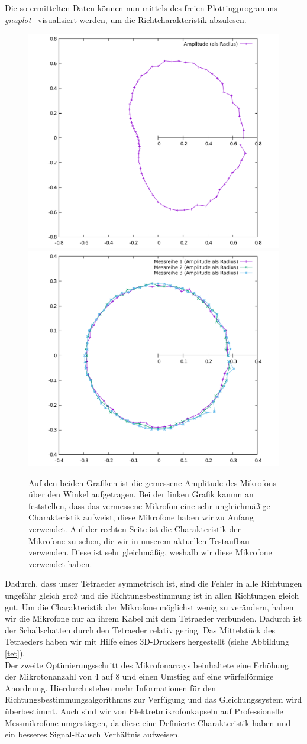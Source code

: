 Die so ermittelten Daten können nun mittels des freien Plottingprogramms \textit{gnuplot}~\cite{Gnuplot} visualisiert werden, um die Richtcharakteristik abzulesen.
\begin{figure}[H]
  \centering
  \includegraphics[width=0.45\linewidth]{img/badMic}
  \includegraphics[width=0.45\linewidth]{img/goodMic}
  \caption{Auf den beiden Grafiken ist die gemessene Amplitude des Mikrofons über den Winkel aufgetragen. Bei der linken Grafik kanmn an feststellen, dass das vermessene Mikrofon eine sehr ungleichmäßige Charakteristik aufweist, diese Mikrofone haben wir zu Anfang verwendet. Auf der rechten Seite ist die Charakteristik der Mikrofone zu sehen, die wir in unserem aktuellen Testaufbau verwenden. Diese ist sehr gleichmäßig, weshalb wir diese Mikrofone verwendet haben.}\label{fig:caracter}
\end{figure}
Dadurch, dass unser Tetraeder symmetrisch ist, sind die Fehler in alle Richtungen ungefähr gleich groß und die Richtungsbestimmung ist in allen Richtungen gleich gut. Um die Charakteristik der Mikrofone möglichst wenig zu verändern, haben wir die Mikrofone nur an ihrem Kabel mit dem Tetraeder verbunden. Dadurch ist der Schallschatten durch den Tetraeder relativ gering. Das Mittelstück des Tetraeders haben wir mit Hilfe eines 3D-Druckers hergestellt (siehe Abbildung \ref{tet}).\\

Der zweite Optimierungsschritt des Mikrofonarrays beinhaltete eine Erhöhung der Mikrotonanzahl von 4 auf 8 und einen Umstieg auf eine würfelförmige Anordnung. Hierdurch stehen mehr Informationen für den Richtungsbestimmungsalgorithmus zur Verfügung und das Gleichungssystem wird überbestimmt. Auch sind wir von Elektretmikrofonkapseln auf Professionelle Messmikrofone umgestiegen, da diese eine Definierte Charakteristik haben und ein besseres Signal-Rausch Verhältnis aufweisen.

